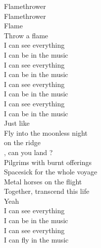 
Flamethrower \\
Flamethrower \\
Flame \\
Throw a flame \\

I can see everything \\
I can be in the music \\
I can see everything \\
I can be in the music \\

I can see everything \\
I can be in the music \\
I can see everything \\
I can be in the music \\

Just like  \\
Fly into the moonless night \\
 on the ridge \\
, can you land ? \\
Pilgrims with burnt offerings \\
Spacesick for the whole voyage \\
Metal horses on the flight \\
Together, transcend this life \\
Yeah \\

I can see everything \\
I can be in the music \\
I can see everything \\
I can fly in the music \\
